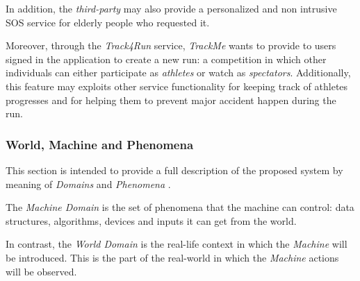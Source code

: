 \documentclass[a4paper]{article}
\begin{document}
        In addition, the \textit{third-party} may also provide a personalized and non intrusive SOS service for elderly people who requested it.
    
        Moreover, through the \textit{Track4Run} service, \textit{TrackMe} wants to provide to users signed in the application to create a new run: a competition in which other individuals can either participate as \textit{athletes} or watch as \textit{spectators}. Additionally, this feature may exploits other service functionality for keeping track of athletes progresses and for helping them to prevent major accident happen during the run.
        
        \subsubsection{World, Machine and Phenomena}
        
        This section is intended to provide a full description of the proposed system by meaning of \textit{Domains} and \textit{Phenomena} \cite{zave1997four}.
    
        The \textit{Machine Domain} is the set of phenomena that the machine can control: data structures, algorithms, devices and inputs it can get from the world.
        
        In contrast, the \textit{World Domain} is the real-life context in which the \textit{Machine} will be introduced. This is the part of the real-world in which the \textit{Machine} actions will be observed.
        
\end{document}
